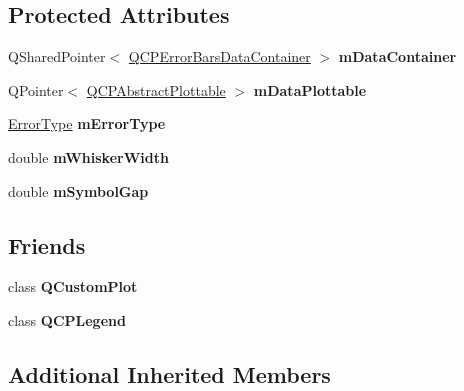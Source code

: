 \subsection*{Protected Attributes}
\begin{DoxyCompactItemize}
\item 
\mbox{\label{class_q_c_p_error_bars_a20c4496f47655b3beb889fe2ca9f8622}} 
Q\+Shared\+Pointer$<$ \hyperlink{class_q_vector}{Q\+C\+P\+Error\+Bars\+Data\+Container} $>$ {\bfseries m\+Data\+Container}
\item 
\mbox{\label{class_q_c_p_error_bars_ad2a0e62d353d64a3dc0bce1a1a3394a9}} 
Q\+Pointer$<$ \hyperlink{class_q_c_p_abstract_plottable}{Q\+C\+P\+Abstract\+Plottable} $>$ {\bfseries m\+Data\+Plottable}
\item 
\mbox{\label{class_q_c_p_error_bars_af9fd3117b86aac728c9e8e87c406ed9a}} 
\hyperlink{class_q_c_p_error_bars_a95f0220f11a72648b96480a85ce26474}{Error\+Type} {\bfseries m\+Error\+Type}
\item 
\mbox{\label{class_q_c_p_error_bars_a3873724f7ac3392bdf9d46a47076a1d2}} 
double {\bfseries m\+Whisker\+Width}
\item 
\mbox{\label{class_q_c_p_error_bars_a5cb5628b75e5aff0875710705666ec57}} 
double {\bfseries m\+Symbol\+Gap}
\end{DoxyCompactItemize}
\subsection*{Friends}
\begin{DoxyCompactItemize}
\item 
\mbox{\label{class_q_c_p_error_bars_a00f8b42d059625f815808a7cc99c2f04}} 
class {\bfseries Q\+Custom\+Plot}
\item 
\mbox{\label{class_q_c_p_error_bars_a6dddb88f268bc26693c552bbb68acbb5}} 
class {\bfseries Q\+C\+P\+Legend}
\end{DoxyCompactItemize}
\subsection*{Additional Inherited Members}


